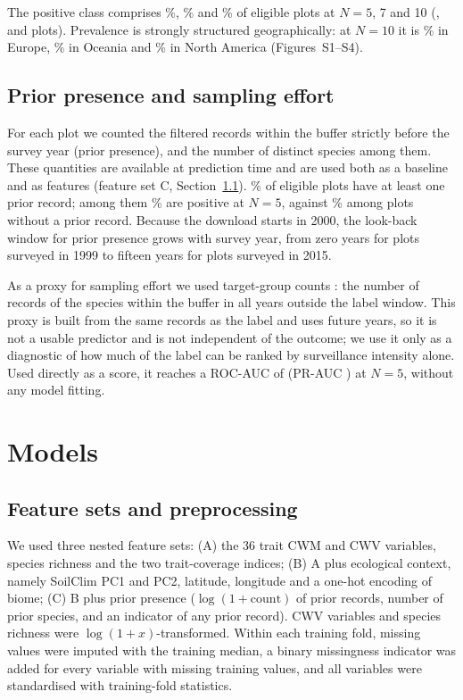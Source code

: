 \documentclass[a4paper,fleqn]{cas-sc}
\begin{document}
The positive class comprises \prevNfive\%, \prevNseven\% and \prevNonezero\% of eligible plots at $N = 5$, 7 and 10 (\nPosNfive, \nPosNseven{} and \nPosNonezero{} plots). Prevalence is strongly structured geographically: at $N=10$ it is \prevContNonezeroEurope\% in Europe, \prevContNonezeroOceania\% in Oceania and \prevContNonezeroNorthAmerica\% in North America (Figures~S1--S4).

\subsection{Prior presence and sampling effort}

For each plot we counted the filtered records within the buffer strictly before the survey year (prior presence), and the number of distinct species among them. These quantities are available at prediction time and are used both as a baseline and as features (feature set C, Section~\ref{sec:features}). \pctPrior\% of eligible plots have at least one prior record; among them \prevGivenPriorNfive\% are positive at $N=5$, against \prevGivenNoPriorNfive\% among plots without a prior record. Because the download starts in 2000, the look-back window for prior presence grows with survey year, from zero years for plots surveyed in 1999 to fifteen years for plots surveyed in 2015.

As a proxy for sampling effort we used target-group counts \citep{phillips2009}: the number of records of the \gbifSpecies{} species within the buffer in all years outside the label window. This proxy is built from the same records as the label and uses future years, so it is not a usable predictor and is not independent of the outcome; we use it only as a diagnostic of how much of the label can be ranked by surveillance intensity alone. Used directly as a score, it reaches a ROC-AUC of \effortOutROCNfive{} (PR-AUC \effortOutPRNfive) at $N=5$, without any model fitting.

\section{Models}
\label{sec:models}

\subsection{Feature sets and preprocessing}
\label{sec:features}

We used three nested feature sets: (A) the 36 trait CWM and CWV variables, species richness and the two trait-coverage indices; (B) A plus ecological context, namely SoilClim PC1 and PC2, latitude, longitude and a one-hot encoding of biome; (C) B plus prior presence ($\log(1+\text{count})$ of prior records, number of prior species, and an indicator of any prior record). CWV variables and species richness were $\log(1+x)$-transformed. Within each training fold, missing values were imputed with the training median, a binary missingness indicator was added for every variable with missing training values, and all variables were standardised with training-fold statistics.
\end{document}
